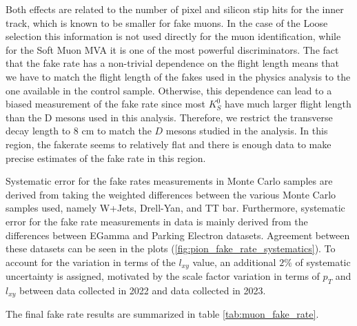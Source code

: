 Both effects are related to the number of pixel and silicon stip hits for the inner track, which is known to be smaller for fake muons. In the case of the Loose selection this information is not used directly for the muon identification, while for the Soft Muon MVA it is one of the most powerful discriminators. The fact that the fake rate has a non-trivial dependence on the flight length means that we have to match the flight length of the fakes used in the physics analysis to the one available in the control sample. Otherwise, this dependence can lead to a biased measurement of the fake rate since most $K_S^0$ have much larger flight length than the D mesons used in this analysis. Therefore, we restrict the transverse decay length to 8 cm to match the $D$ mesons studied in the analysis. In this region, the fakerate seems to relatively flat and there is enough data to make precise estimates of the fake rate in this region. 

Systematic error for the fake rates measurements in Monte Carlo samples are derived from taking the weighted differences between the various Monte Carlo samples used, namely W+Jets, Drell-Yan, and TT bar. Furthermore, systematic error for the fake rate measurements in data is mainly derived  from the differences between EGamma and Parking Electron datasets. Agreement between these datasets can be seen in the plots (\ref{fig:pion_fake_rate_systematics}). To account for the variation in terms of the $l_{xy}$ value, an additional $2\%$ of systematic uncertainty is assigned, motivated by the scale factor variation in terms of $p_T$ and $l_{xy}$ between data collected in 2022 and data collected in 2023. 

The final fake rate results are summarized in table \ref{tab:muon_fake_rate}.

